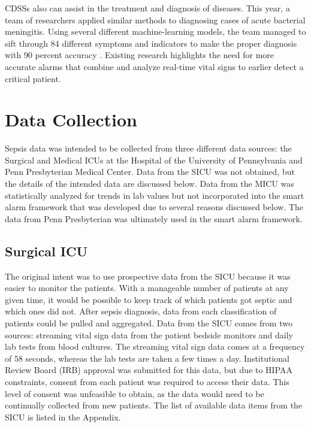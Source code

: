 \documentclass{sig-alternate}
\begin{document}
CDSSs also can assist in the treatment and diagnosis of diseases. This year, a team of researchers applied similar methods to diagnosing cases of acute bacterial meningitis. Using several different machine-learning models, the team managed to sift through 84 different symptoms and indicators to make the proper diagnosis with 90 percent accuracy \cite{bayes}. Existing research highlights the need for more accurate alarms that combine and analyze real-time vital signs to earlier detect a critical patient. 

\vspace{10pt}
\section{Data Collection}
\vspace{10pt}
\label{sec:data}

Sepsis data was intended to be collected from three different data sources: the Surgical and Medical ICUs at the Hospital of the University of Pennsylvania and Penn Presbyterian Medical Center.  Data from the SICU was not obtained, but the details of the intended data are discussed below.  Data from the MICU was statistically analyzed for trends in lab values but not incorporated into the smart alarm framework that was developed due to several reasons discussed below.  The data from Penn Presbyterian was ultimately used in the smart alarm framework.

\vspace{30pt}
\subsection{Surgical ICU}
\label{subsec:sicu}
\vspace{10pt}

The original intent was to use prospective data from the SICU because it was easier to monitor the patients.  With a manageable number of patients at any given time, it would be possible to keep track of which patients got septic and which ones did not.  After sepsis diagnosis, data from each classification of patients could be pulled and aggregated.  Data from the SICU comes from two sources: streaming vital sign data from the patient bedside monitors and daily lab tests from blood cultures.  The streaming vital sign data comes at a frequency of 58 seconds, whereas the lab tests are taken a few times a day.  Institutional Review Board (IRB) approval was submitted for this data, but due to HIPAA constraints, consent from each patient was required to access their data.  This level of consent was unfeasible to obtain, as the data would need to be continually collected from new patients.  The list of available data items from the SICU is listed in the Appendix.
\end{document}
